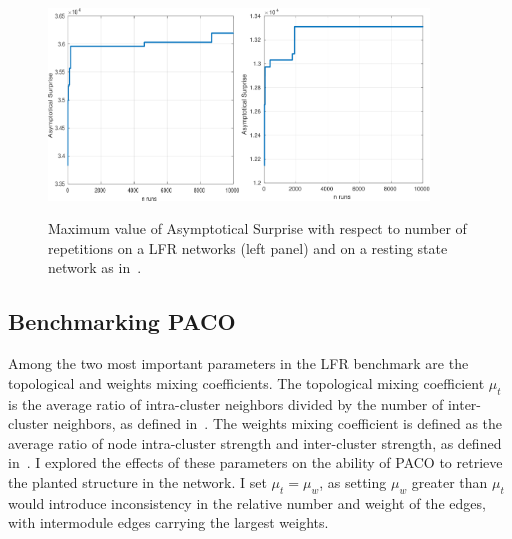 \noindent\begin{figure}[htb!]
\centering
\includegraphics[width=0.45\textwidth]{images/paco_variability_nreps_lfr.png}\includegraphics[width=0.45\textwidth]{images/paco_variability_nreps_bullmore.png}
\caption{Maximum value of Asymptotical Surprise with respect to number of repetitions on a LFR networks (left panel) and on a resting state network as in~\cite{crossley2013a}.}
\label{fig:paco_variability}
\end{figure}


\subsection{Benchmarking PACO}
Among the two most important parameters in the LFR benchmark are the topological and weights mixing coefficients. 
The topological mixing coefficient $\mu_t$ is the average ratio of intra-cluster neighbors divided by the number of inter-cluster neighbors, as defined in~\cite{lancichinetti2008}.
The weights mixing coefficient is defined as the average ratio of node intra-cluster strength and inter-cluster strength, as defined in~\cite{lancichinetti2009a}.
I explored the effects of these parameters on the ability of PACO to retrieve the planted structure in the network.
I set $\mu_t=\mu_w$, as setting $\mu_w$ greater than $\mu_t$ would introduce inconsistency in the relative number and weight of the edges, with intermodule edges carrying the largest weights.


